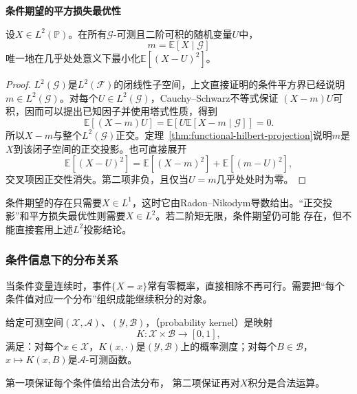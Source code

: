 \par\medskip\noindent\textbf{条件期望的平方损失最优性}\quad
\begin{theorem}[条件均值的平方损失最优性]
\label{thm:probability-conditional-mean-l2-projection}
设\(X\in L^2(\mathbb{P})\)。在所有\(\mathcal{G}\)-可测且二阶可积的随机变量\(U\)中，
\[ m=\mathbb{E}[X\mid\mathcal{G}] \]
唯一地在几乎处处意义下最小化\(\mathbb{E}[(X-U)^2]\)。
\end{theorem}

\begin{proof}
\(L^2(\mathcal{G})\)是\(L^2(\mathcal{F})\)的闭线性子空间，上文直接证明的条件平方界已经说明
\(m\in L^2(\mathcal{G})\)。对每个\(U\in L^2(\mathcal{G})\)，Cauchy--Schwarz不等式保证
\((X-m)U\)可积，因而可以提出已知因子并使用塔式性质，得到
\[ \mathbb{E}[(X-m)U]
  =\mathbb{E}\left[U\mathbb{E}[X-m\mid\mathcal{G}]\right]=0. \]
所以\(X-m\)与整个\(L^2(\mathcal{G})\)正交。定理~\ref{thm:functional-hilbert-projection}说明\(m\)是\(X\)到该闭子空间的正交投影。也可直接展开
\begin{equation}
  \mathbb{E}[(X-U)^2]
  =
  \mathbb{E}[(X-m)^2]
  +
  \mathbb{E}[(m-U)^2],
  \label{eq:probability-pythagorean-prediction}
\end{equation}
交叉项因正交性消失。第二项非负，且仅当\(U=m\)几乎处处时为零。
\end{proof}

条件期望的存在只需要\(X\in L^1\)，这时它由Radon--Nikodym导数给出。“正交投影”和平方损失最优性则需要\(X\in L^2\)。若二阶矩无限，条件期望仍可能
存在，但不能直接套用上述\(L^2\)投影结论。


\subsubsection{条件信息下的分布关系}
\label{sec:rv-conditional-distribution}
当条件变量连续时，事件\(\{X=x\}\)常有零概率，直接相除不再可行。需要把“每个条件值对应一个分布”组织成能继续积分的对象。
\begin{definition}[概率核]
  \label{def:probability-kernel}
  给定可测空间\((\mathcal X,\mathcal A)\)、\((\mathcal Y,\mathcal B)\)，（probability kernel）是映射
  \[ K:\mathcal X\times\mathcal B\to[0,1], \]
  满足：对每个\(x\in\mathcal X\)，\(K(x,\cdot)\)是\((\mathcal Y,\mathcal B)\)上的概率测度；对每个\(B\in\mathcal B\)，\(x\mapsto K(x,B)\)是\(\mathcal A\)-可测函数。
\end{definition}
第一项保证每个条件值给出合法分布，
第二项保证再对\(X\)积分是合法运算。


